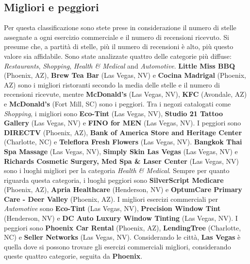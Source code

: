 \documentclass[12pt]{article}
\begin{document}
\subsection{Migliori e peggiori}
Per questa classificazione sono stete prese in considerazione il numero di stelle assegnate a ogni esercizio commerciale e il numero di recensioni ricevuto. Si presume che, a partità di stelle, più il numero di recensioni è alto, più questo valore sia affidabile. \newline
Sono state analizzate quattro delle categorie più diffuse: \textit{Restaurants}, \textit{Shopping}, \textit{Health \& Medical} and \textit{Automotive}.\newline
\textbf{Little Miss BBQ} (Phoenix, AZ), \textbf{Brew Tea Bar} (Las Vegas, NV) e \textbf{Cocina Madrigal} (Phoenix, AZ) sono i migliori ristoranti secondo la media delle stelle e il numero di recensioni ricevute, mentre \textbf{McDonald's} (Las Vegas, NV), \textbf{KFC} (Avondale, AZ) e \textbf{McDonald's} (Fort Mill, SC) sono i peggiori.\newline
Tra i negozi catalogati come \textit{Shopping}, i migliori sono \textbf{Eco-Tint} (Las Vegas, NV), \textbf{Studio 21 Tattoo Gallery} (Las Vegas, NV) e \textbf{FINO for MEN} (Las Vegas, NV). I peggiori sono \textbf{DIRECTV} (Phoenix, AZ), \textbf{Bank of America Store and Heritage Center} (Charlotte, NC) e \textbf{Teleflora Fresh Flowers} (Las Vegas, NV). \newline
\textbf{Bangkok Thai Spa Massage} (Las Vegas, NV), \textbf{Simply Skin Las Vegas} (Las Vegas, NV) e \textbf{Richards Cosmetic Surgery, Med Spa \& Laser Center} (Las Vegas, NV) sono i luoghi migliori per la categoria \textit{Health \& Medical}. Sempre per quanto riguarda questa categoria, i luoghi peggiori sono \textbf{SilverScript Medicare} (Phoenix, AZ), \textbf{Apria Healthcare} (Henderson, NV) e \textbf{OptumCare Primary Care - Deer Valley} (Phoenix, AZ).\newline
I migliori esercizi commerciali per \textit{Automotive} sono \textbf{Eco-Tint} (Las Vegas, NV), \textbf{Precision Window Tint} (Henderson, NV) e \textbf{DC Auto Luxury Window Tinting} (Las Vegas, NV). I peggiori sono \textbf{Phoenix Car Rental} (Phoenix, AZ), \textbf{LendingTree} (Charlotte, NC) e \textbf{Seller Networks} (Las Vegas, NV).\newline
Considerando le città, \textbf{Las Vegas} è quella dove si possono trovare gli esercizi commerciali migliori, considerando queste quattro categorie, seguita da \textbf{Phoenix}.
\end{document}

